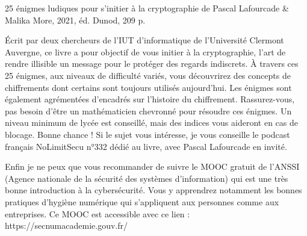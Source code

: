     25 énigmes ludiques pour s’initier à la cryptographie de Pascal Lafourcade & Malika More, 2021, éd. Dunod, 209 p.

Écrit par deux chercheurs de l’IUT d’informatique de l’Université Clermont Auvergne, ce livre a pour objectif de vous initier à la cryptographie, l’art de rendre illisible un message pour le protéger des regards indiscrets. À travers ces 25 énigmes, aux niveaux de difficulté variés, vous découvrirez des concepts de chiffrements dont certains sont toujours utilisés aujourd’hui. Les énigmes sont également agrémentées d’encadrés sur l’histoire du chiffrement. Rassurez-vous, pas besoin d’être un mathématicien chevronné pour résoudre ces énigmes. Un niveau minimum de lycée est conseillé, mais des indices vous aideront en cas de blocage. Bonne chance ! Si le sujet vous intéresse, je vous conseille le podcast français NoLimitSecu n°332 dédié au livre, avec Pascal Lafourcade en invité.

Enfin je ne peux que vous recommander de suivre le MOOC gratuit de l’ANSSI (Agence nationale de la sécurité des systèmes d'information) qui est une très bonne introduction à la cybersécurité. Vous y apprendrez notamment les bonnes pratiques d’hygiène numérique qui s’appliquent aux personnes comme aux entreprises. Ce MOOC est accessible avec ce lien : https://secnumacademie.gouv.fr/
